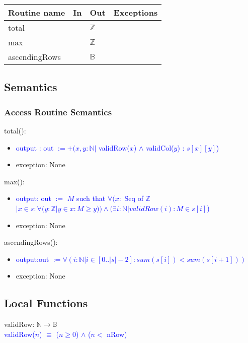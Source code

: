 \documentclass[12pt]{article}
\begin{document}
\begin{itemize}
\begin{itemize}
\begin{itemize}
\begin{tabular}{| l | l | l | p{6cm} |}
\hline
\textbf{Routine name} & \textbf{In} & \textbf{Out} & \textbf{Exceptions}\\
\hline
total & & $\mathbb{Z}$ & \\
\hline
max &  & $\mathbb{Z}$ & \\
\hline
ascendingRows & & $\mathbb{B}$ & \\
\hline
\end{tabular}

\subsection* {Semantics}

\subsubsection* {Access Routine Semantics}

\noindent total(): 
\begin{itemize}
\item \textcolor{blue}{output : out $:= +(x, y : \mathbb{N} |$ validRow($x$) $\land$ validCol($y$) : $s[x][y]$)}
\item exception: None
\end{itemize}

\noindent max():
\begin{itemize}
\item \textcolor{blue}{output: out $:=$ $M$ such that $\forall (x : $ Seq of $\mathbb{Z}$ $| x \in s : \forall (y : \mathbb{Z} | y \in x : M \geq y ))  \land (\exists i : \mathbb{N} | validRow(i) : M \in s[i] $)}
\item exception: None
\end{itemize}

\noindent ascendingRows():
\begin{itemize}
\item \textcolor{blue}{output:out $:= \forall (i : \mathbb{N} | i \in [0..|s|-2] : sum(s[i]) < sum(s[i+1])) $}
\item exception: None
\end{itemize}

\subsection*{Local Functions}

\noindent validRow: $\mathbb{N} \rightarrow \mathbb{B}$\\
\noindent \textcolor{blue}{validRow($n$) $\equiv$ ($n \geq 0$) $\land$ ($n < $ nRow)}\\


\end{itemize}
\end{itemize}
\end{itemize}
\end{document}

